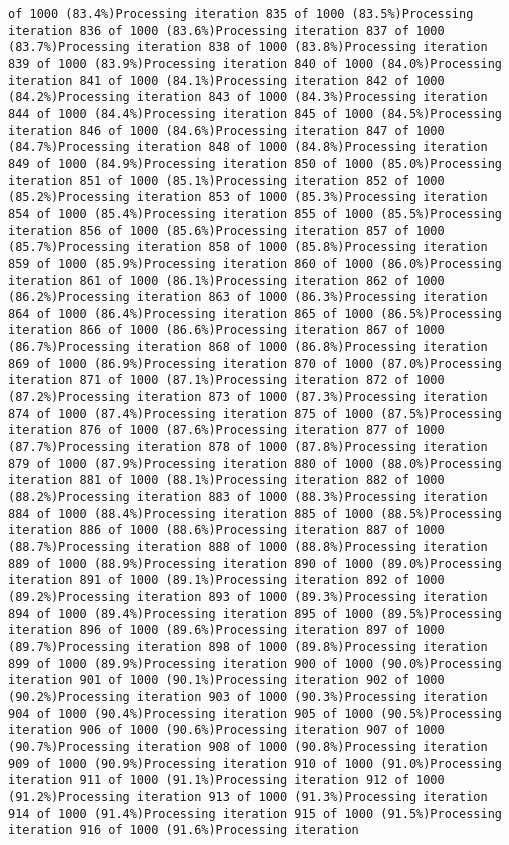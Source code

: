 \documentclass[
]{article}
\begin{document}
\begin{verbatim}
of 1000 (83.4%)Processing iteration 835 of 1000 (83.5%)Processing iteration 836 of 1000 (83.6%)Processing iteration 837 of 1000 (83.7%)Processing iteration 838 of 1000 (83.8%)Processing iteration 839 of 1000 (83.9%)Processing iteration 840 of 1000 (84.0%)Processing iteration 841 of 1000 (84.1%)Processing iteration 842 of 1000 (84.2%)Processing iteration 843 of 1000 (84.3%)Processing iteration 844 of 1000 (84.4%)Processing iteration 845 of 1000 (84.5%)Processing iteration 846 of 1000 (84.6%)Processing iteration 847 of 1000 (84.7%)Processing iteration 848 of 1000 (84.8%)Processing iteration 849 of 1000 (84.9%)Processing iteration 850 of 1000 (85.0%)Processing iteration 851 of 1000 (85.1%)Processing iteration 852 of 1000 (85.2%)Processing iteration 853 of 1000 (85.3%)Processing iteration 854 of 1000 (85.4%)Processing iteration 855 of 1000 (85.5%)Processing iteration 856 of 1000 (85.6%)Processing iteration 857 of 1000 (85.7%)Processing iteration 858 of 1000 (85.8%)Processing iteration 859 of 1000 (85.9%)Processing iteration 860 of 1000 (86.0%)Processing iteration 861 of 1000 (86.1%)Processing iteration 862 of 1000 (86.2%)Processing iteration 863 of 1000 (86.3%)Processing iteration 864 of 1000 (86.4%)Processing iteration 865 of 1000 (86.5%)Processing iteration 866 of 1000 (86.6%)Processing iteration 867 of 1000 (86.7%)Processing iteration 868 of 1000 (86.8%)Processing iteration 869 of 1000 (86.9%)Processing iteration 870 of 1000 (87.0%)Processing iteration 871 of 1000 (87.1%)Processing iteration 872 of 1000 (87.2%)Processing iteration 873 of 1000 (87.3%)Processing iteration 874 of 1000 (87.4%)Processing iteration 875 of 1000 (87.5%)Processing iteration 876 of 1000 (87.6%)Processing iteration 877 of 1000 (87.7%)Processing iteration 878 of 1000 (87.8%)Processing iteration 879 of 1000 (87.9%)Processing iteration 880 of 1000 (88.0%)Processing iteration 881 of 1000 (88.1%)Processing iteration 882 of 1000 (88.2%)Processing iteration 883 of 1000 (88.3%)Processing iteration 884 of 1000 (88.4%)Processing iteration 885 of 1000 (88.5%)Processing iteration 886 of 1000 (88.6%)Processing iteration 887 of 1000 (88.7%)Processing iteration 888 of 1000 (88.8%)Processing iteration 889 of 1000 (88.9%)Processing iteration 890 of 1000 (89.0%)Processing iteration 891 of 1000 (89.1%)Processing iteration 892 of 1000 (89.2%)Processing iteration 893 of 1000 (89.3%)Processing iteration 894 of 1000 (89.4%)Processing iteration 895 of 1000 (89.5%)Processing iteration 896 of 1000 (89.6%)Processing iteration 897 of 1000 (89.7%)Processing iteration 898 of 1000 (89.8%)Processing iteration 899 of 1000 (89.9%)Processing iteration 900 of 1000 (90.0%)Processing iteration 901 of 1000 (90.1%)Processing iteration 902 of 1000 (90.2%)Processing iteration 903 of 1000 (90.3%)Processing iteration 904 of 1000 (90.4%)Processing iteration 905 of 1000 (90.5%)Processing iteration 906 of 1000 (90.6%)Processing iteration 907 of 1000 (90.7%)Processing iteration 908 of 1000 (90.8%)Processing iteration 909 of 1000 (90.9%)Processing iteration 910 of 1000 (91.0%)Processing iteration 911 of 1000 (91.1%)Processing iteration 912 of 1000 (91.2%)Processing iteration 913 of 1000 (91.3%)Processing iteration 914 of 1000 (91.4%)Processing iteration 915 of 1000 (91.5%)Processing iteration 916 of 1000 (91.6%)Processing iteration 
\end{verbatim}
\end{document}

